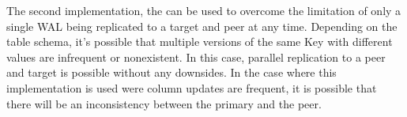 The second implementation, the  can be used to overcome the limitation
of only a single WAL being replicated to a target and peer at any time. Depending on the table schema,
it's possible that multiple versions of the same Key with different values are infrequent or nonexistent.
In this case, parallel replication to a peer and target is possible without any downsides. In the case
where this implementation is used were column updates are frequent, it is possible that there will be
an inconsistency between the primary and the peer.
